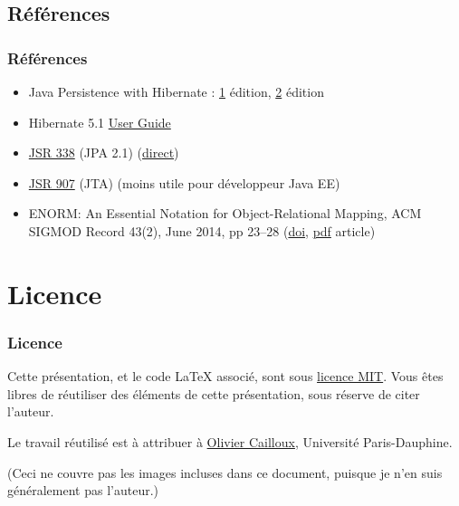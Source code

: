 \documentclass[english, french]{beamer}
\begin{document}
\subsection{Références}
\begin{frame}
	\frametitle{Références}
	\begin{itemize}
		\item Java Persistence with Hibernate : \href{http://gen.lib.rus.ec/book/index.php?md5=5D9F8BC8761804C0EBB8FE6A60BCF817}{1\iere} édition, \href{https://www.manning.com/books/java-persistence-with-hibernate-second-edition}{2\ieme} édition
		\item Hibernate 5.1 \href{http://docs.jboss.org/hibernate/orm/5.1/userguide/html_single/Hibernate_User_Guide.html}{User Guide}
		\item \href{https://jcp.org/en/jsr/detail?id=338}{JSR 338} (JPA 2.1) (\href{http://download.oracle.com/otn-pub/jcp/persistence-2_1-fr-eval-spec/JavaPersistence.pdf}{direct})
		\item \href{https://jcp.org/en/jsr/detail?id=907}{JSR 907} (JTA) (moins utile pour développeur Java EE)
		\item ENORM: An Essential Notation for Object-Relational Mapping, ACM SIGMOD Record 43(2), June 2014, pp 23–28 (\href{http://dx.doi.org/10.1145/2694413.2694418}{doi}, \href{http://www.sigmod.org/publications/sigmod-record/1406/pdfs/05.articles.Torres.pdf}{pdf} article)
	\end{itemize}
\end{frame}

\appendix
\AtBeginSection{
}
\section{Licence}
\begin{frame}
	\frametitle{Licence}
	Cette présentation, et le code LaTeX associé, sont sous \href{http://opensource.org/licenses/MIT}{licence MIT}. Vous êtes libres de réutiliser des éléments de cette présentation, sous réserve de citer l’auteur.
	
	Le travail réutilisé est à attribuer à \href{http://www.lamsade.dauphine.fr/~ocailloux/}{Olivier Cailloux}, Université Paris-Dauphine.
	
	\small{(Ceci ne couvre pas les images incluses dans ce document, puisque je n’en suis généralement pas l’auteur.)}
\end{frame}
\end{document}
